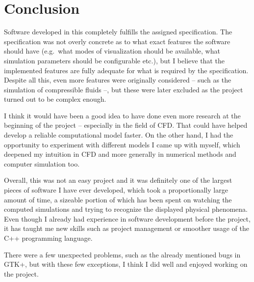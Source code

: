 \documentclass[11pt,a4paper,twoside,openright]{report}
\begin{document}
\chapter*{Conclusion}

\pagestyle{empty}

Software developed in this \this{} completely fulfills the assigned specification. The specification was not overly concrete as to what exact features the software should have (e.g.\ what modes of visualization should be available, what simulation parameters should be configurable etc.), but I believe that the implemented features are fully adequate for what is required by the specification. Despite all this, even more features were originally considered -- such as the simulation of compressible fluids --, but these were later excluded as the project turned out to be complex enough.

I think it would have been a good idea to have done even more research at the beginning of the project -- especially in the field of CFD. That could have helped develop a reliable computational model faster. On the other hand, I had the opportunity to experiment with different models I came up with myself, which deepened my intuition in CFD and more generally in numerical methods and computer simulation too.

Overall, this was not an easy project and it was definitely one of the largest pieces of software I have ever developed, which took a proportionally large amount of time, a sizeable portion of which has been spent on watching the computed simulations and trying to recognize the displayed physical phenomena. Even though I already had experience in software development before the project, it has taught me new skills such as project management or smoother usage of the C++ programming language.

There were a few unexpected problems, such as the already mentioned bugs in GTK+, but with these few exceptions, I think I did well and enjoyed working on the project.
\end{document}

